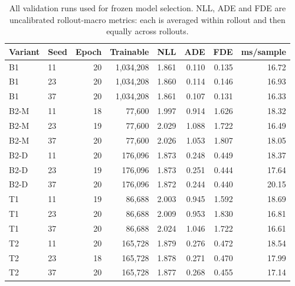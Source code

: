\begin{table}[p]
\centering\scriptsize
\caption{All validation runs used for frozen model selection. NLL, ADE and FDE are uncalibrated rollout-macro metrics: each is averaged within rollout and then equally across rollouts.}
\label{tab:app-validation}
\begin{tabular}{@{}llrrrrrr@{}}
\toprule
Variant & Seed & Epoch & Trainable & NLL & ADE & FDE & ms/sample \\
\midrule
B1 & 11 & 20 & 1,034,208 & 1.861 & 0.110 & 0.135 & 16.72 \\
B1 & 23 & 20 & 1,034,208 & 1.860 & 0.114 & 0.146 & 16.93 \\
B1 & 37 & 20 & 1,034,208 & 1.861 & 0.107 & 0.131 & 16.33 \\
B2-M & 11 & 18 & 77,600 & 1.997 & 0.914 & 1.626 & 18.32 \\
B2-M & 23 & 19 & 77,600 & 2.029 & 1.088 & 1.722 & 16.49 \\
B2-M & 37 & 20 & 77,600 & 2.026 & 1.053 & 1.807 & 18.05 \\
B2-D & 11 & 20 & 176,096 & 1.873 & 0.248 & 0.449 & 18.37 \\
B2-D & 23 & 19 & 176,096 & 1.873 & 0.251 & 0.444 & 17.64 \\
B2-D & 37 & 20 & 176,096 & 1.872 & 0.244 & 0.440 & 20.15 \\
T1 & 11 & 19 & 86,688 & 2.003 & 0.945 & 1.592 & 18.69 \\
T1 & 23 & 20 & 86,688 & 2.009 & 0.953 & 1.830 & 16.81 \\
T1 & 37 & 20 & 86,688 & 2.024 & 1.046 & 1.722 & 16.61 \\
T2 & 11 & 20 & 165,728 & 1.879 & 0.276 & 0.472 & 18.54 \\
T2 & 23 & 18 & 165,728 & 1.878 & 0.271 & 0.470 & 17.99 \\
T2 & 37 & 20 & 165,728 & 1.877 & 0.268 & 0.455 & 17.14 \\
\bottomrule
\end{tabular}
\end{table}
